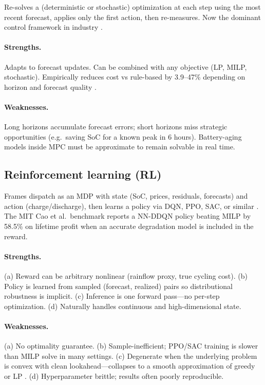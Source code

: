 \documentclass[11pt]{article}
\begin{document}
Re-solves a (deterministic or stochastic) optimization at each step using the most recent forecast, applies only the first action, then re-measures. Now the dominant control framework in industry \citep{degradation2025mpc, evaluation2025mpc}.

\paragraph{Strengths.} Adapts to forecast updates. Can be combined with any objective (LP, MILP, stochastic). Empirically reduces cost vs rule-based by 3.9--47\% depending on horizon and forecast quality \citep{evaluation2025mpc}.

\paragraph{Weaknesses.} Long horizons accumulate forecast errors; short horizons miss strategic opportunities (e.g.\ saving SoC for a known peak in 6 hours). Battery-aging models inside MPC must be approximate to remain solvable in real time.

\subsection{Reinforcement learning (RL)}

Frames dispatch as an MDP with state (SoC, prices, residuals, forecasts) and action (charge/discharge), then learns a policy via DQN, PPO, SAC, or similar \citep{cao2020drl, sayfutdinov2022, kazemi2025rl}. The MIT Cao et al.\ benchmark \citep{cao2020drl} reports a NN-DDQN policy beating MILP by 58.5\% on lifetime profit when an accurate degradation model is included in the reward.

\paragraph{Strengths.} (a) Reward can be arbitrary nonlinear (rainflow proxy, true cycling cost). (b) Policy is learned from sampled (forecast, realized) pairs so distributional robustness is implicit. (c) Inference is one forward pass---no per-step optimization. (d) Naturally handles continuous and high-dimensional state.

\paragraph{Weaknesses.} (a) No optimality guarantee. (b) Sample-inefficient; PPO/SAC training is slower than MILP solve in many settings. (c) Degenerate when the underlying problem is convex with clean lookahead---collapses to a smooth approximation of greedy or LP \citep{srinivasa2026degradation}. (d) Hyperparameter brittle; results often poorly reproducible.
\end{document}
